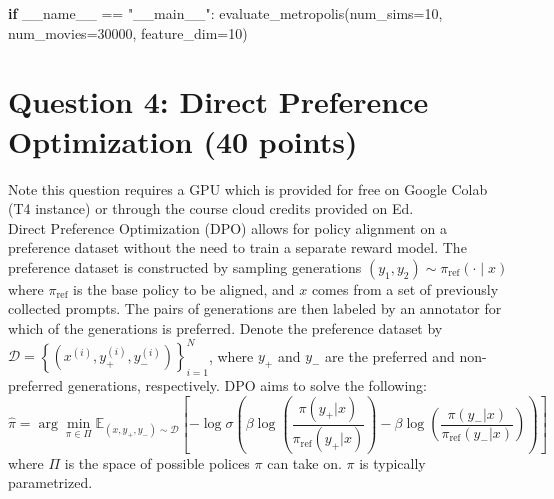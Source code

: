 \documentclass[
  letterpaper,
  DIV=11,
  numbers=noendperiod,
  oneside]{scrreprt}
\newenvironment{Shaded}{\begin{snugshade}}{\end{snugshade}}
\newcommand{\ControlFlowTok}[1]{\textcolor[rgb]{0.00,0.23,0.31}{\textbf{#1}}}
\newcommand{\DecValTok}[1]{\textcolor[rgb]{0.68,0.00,0.00}{#1}}
\newcommand{\NormalTok}[1]{\textcolor[rgb]{0.00,0.23,0.31}{#1}}
\newcommand{\OperatorTok}[1]{\textcolor[rgb]{0.37,0.37,0.37}{#1}}
\newcommand{\StringTok}[1]{\textcolor[rgb]{0.13,0.47,0.30}{#1}}
\newcommand{\VariableTok}[1]{\textcolor[rgb]{0.07,0.07,0.07}{#1}}
\theoremstyle{remark}
\begin{document}
\begin{Shaded}
\begin{Highlighting}[]
\ControlFlowTok{if} \VariableTok{\_\_name\_\_} \OperatorTok{==} \StringTok{"\_\_main\_\_"}\NormalTok{:}
\NormalTok{    evaluate\_metropolis(num\_sims}\OperatorTok{=}\DecValTok{10}\NormalTok{, num\_movies}\OperatorTok{=}\DecValTok{30000}\NormalTok{, feature\_dim}\OperatorTok{=}\DecValTok{10}\NormalTok{)}
\end{Highlighting}
\end{Shaded}

\section*{Question 4: Direct Preference Optimization (40
points)}\label{question-4-direct-preference-optimization-40-points}


Note this question requires a GPU which is provided for free on Google
Colab (T4 instance) or through the course cloud credits provided on
Ed.\\
Direct Preference Optimization (DPO) allows for policy alignment on a
preference dataset without the need to train a separate reward model.
The preference dataset is constructed by sampling generations
\((y_1, y_2)\sim \pi_{\text{ref}}(\cdot\mid x)\) where
\(\pi_\text{ref}\) is the base policy to be aligned, and \(x\) comes
from a set of previously collected prompts. The pairs of generations are
then labeled by an annotator for which of the generations is preferred.
Denote the preference dataset by
\(\mathcal{D}=\left\{\left(x^{(i)}, y_+^{(i)}, y_-^{(i)}\right)\right\}_{i=1}^N\),
where \(y_+\) and \(y_-\) are the preferred and non-preferred
generations, respectively. DPO aims to solve the following:
\[\hat{\pi}=\arg \min_{\pi\in\Pi}\mathbb{E}_{(x, y_+, y_-)\sim\mathcal{D}}\left[-\log\sigma\left(
\beta\log\left(\frac{\pi(y_+ | x)}{\pi_{\text{ref}}(y_+ | x)}\right)-\beta\log\left(\frac{\pi(y_- | x)}{\pi_{\text{ref}}(y_- | x)}\right)\right)\right]\]
where \(\Pi\) is the space of possible polices \(\pi\) can take on.
\(\pi\) is typically parametrized.
\end{document}
